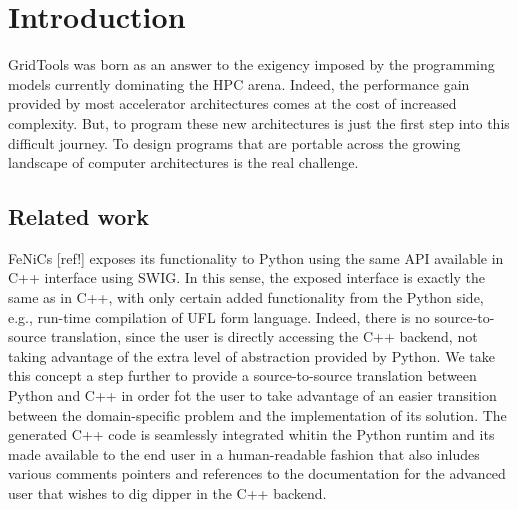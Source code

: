 \documentclass[english]{article}
\begin{document}
\section{Introduction}
GridTools was born as an answer to the exigency imposed by the programming models currently dominating the HPC arena.
Indeed, the performance gain provided by most accelerator architectures comes at the cost of increased complexity.
But, to program these new architectures is just the first step into this difficult journey.
To design programs that are portable across the growing landscape of computer architectures is the real challenge.



\subsection{Related work}
FeNiCs [ref!] exposes its functionality to Python using the same API available in C++ interface using SWIG.
In this sense, the exposed interface is exactly the same as in C++, with only certain added functionality from the Python side, e.g., run-time compilation of UFL form language.
Indeed, there is no source-to-source translation, since the user is directly accessing the C++ backend, not taking advantage of the extra level of abstraction provided by Python.
We take this concept a step further to provide a source-to-source translation between Python and C++ in order fot the user to take advantage of an easier transition between the domain-specific problem and the implementation of its solution.
The generated C++ code is seamlessly integrated whitin the Python runtim and its made available to the end user in a human-readable fashion that also inludes various comments pointers and references to the documentation for the advanced user that wishes to dig dipper in the C++ backend.
\end{document}

